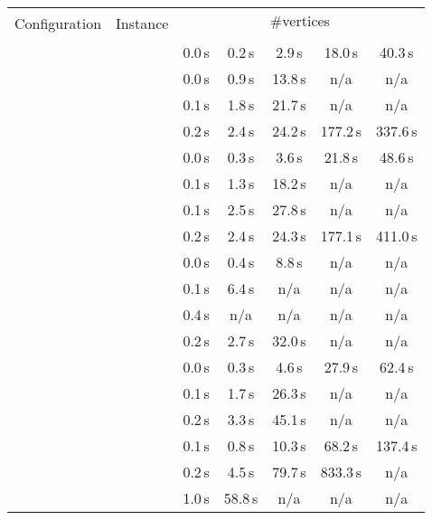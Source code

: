 \begin{table}
	\centering
	\small
	\begin{tabular}{|l|l|ccccc|}
		\hline
		\multirow{2}{*}{Configuration} & \multirow{2}{*}{Instance} & \multicolumn{5}{|c|}{\#vertices} \\
		& &  &  &  &  &  \\
		\hline
		\hline
		\multirow{4}{*}{\vdefault}
			& \walk           &   0.0\,s &   0.2\,s &   2.9\,s &  18.0\,s &  40.3\,s \\
			& \sinewalk       &   0.0\,s &   0.9\,s &  13.8\,s &      n/a &      n/a \\
			& \parabolawalk   &   0.1\,s &   1.8\,s &  21.7\,s &      n/a &      n/a \\
			& \concavevalleys &   0.2\,s &   2.4\,s &  24.2\,s & 177.2\,s & 337.6\,s \\
		\hline
		\multirow{4}{*}{\vnodom}
			& \walk           &   0.0\,s &   0.3\,s &   3.6\,s &  21.8\,s &  48.6\,s \\
			& \sinewalk       &   0.1\,s &   1.3\,s &  18.2\,s &      n/a &      n/a \\
			& \parabolawalk   &   0.1\,s &   2.5\,s &  27.8\,s &      n/a &      n/a \\
			& \concavevalleys &   0.2\,s &   2.4\,s &  24.3\,s & 177.1\,s & 411.0\,s \\
		\hline
		\multirow{4}{*}{\vnow}
			& \walk           &   0.0\,s &   0.4\,s &   8.8\,s &      n/a &      n/a \\
			& \sinewalk       &   0.1\,s &   6.4\,s &      n/a &      n/a &      n/a \\
			& \parabolawalk   &   0.4\,s &      n/a &      n/a &      n/a &      n/a \\
			& \concavevalleys &   0.2\,s &   2.7\,s &  32.0\,s &      n/a &      n/a \\
		\hline
		\hline
		\multirow{4}{*}{\pdefault}
			& \walk           &   0.0\,s &   0.3\,s &   4.6\,s &  27.9\,s &  62.4\,s \\
			& \sinewalk       &   0.1\,s &   1.7\,s &  26.3\,s &      n/a &      n/a \\
			& \parabolawalk   &   0.2\,s &   3.3\,s &  45.1\,s &      n/a &      n/a \\
			& \concavevalleys &   0.1\,s &   0.8\,s &  10.3\,s &  68.2\,s & 137.4\,s \\
		\hline
		\multirow{4}{*}{\pnoedge}
			& \walk           &   0.2\,s &   4.5\,s &  79.7\,s & 833.3\,s &      n/a \\
			& \sinewalk       &   1.0\,s &  58.8\,s &      n/a &      n/a &      n/a \\

\end{tabular}
\end{table}
